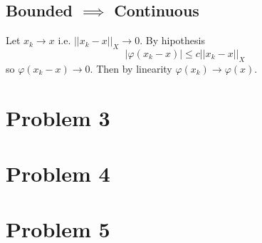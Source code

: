 \documentclass{article}
\begin{document}
\subsection*{Bounded $\implies$ Continuous}
Let $x_k \to x$ i.e. $||x_k-x||_X \to 0$. By hipothesis
\[
	|\varphi(x_k-x)|\leq c ||x_k-x||_X
\]
so $\varphi(x_k-x) \to 0$. Then by linearity $\varphi(x_k)\to \varphi(x)$.

\section*{Problem 3}
\section*{Problem 4}
\section*{Problem 5}
\end{document}
